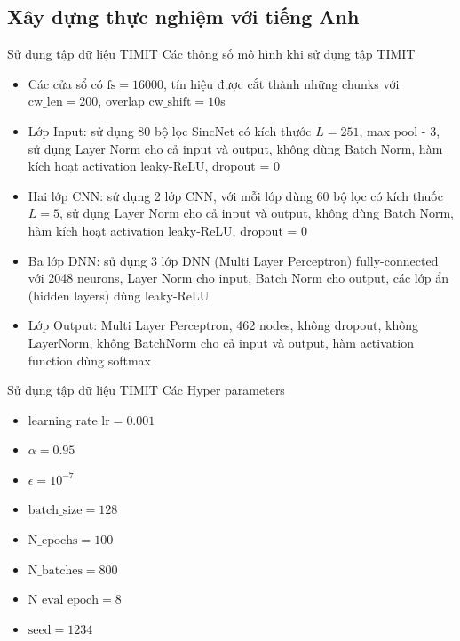 \documentclass[notheorems, aspectratio=54]{beamer}
\begin{document}
\subsection{Xây dựng thực nghiệm với \textbf{tiếng Anh}}
\begin{frame}{Sử dụng tập dữ liệu TIMIT}
	Các thông số mô hình khi sử dụng tập TIMIT
	\begin{itemize}
		\item Các cửa sổ có $\text{fs} = 16000$, tín hiệu được cắt thành những chunks với $\text{cw\_len}=200$, overlap $\text{cw\_shift}=10$s
		\item Lớp Input: sử dụng 80 bộ lọc SincNet có kích thước $L=251$, max pool - 3, sử dụng Layer Norm cho cả input và output, không dùng Batch Norm, hàm kích hoạt activation leaky-ReLU, dropout = 0
		\item Hai lớp CNN: sử dụng 2 lớp CNN, với mỗi lớp dùng 60 bộ lọc có kích thuốc $L=5$, sử dụng Layer Norm cho cả input và output, không dùng Batch Norm, hàm kích hoạt activation leaky-ReLU, dropout = 0
		\item Ba lớp DNN: sử dụng 3 lớp DNN (Multi Layer Perceptron) fully-connected với 2048 neurons, Layer Norm cho input, Batch Norm cho output, các lớp ẩn (hidden layers) dùng leaky-ReLU
		\item Lớp Output: Multi Layer Perceptron, 462 nodes, không dropout, không LayerNorm, không BatchNorm cho cả input và output, hàm activation function dùng softmax 
	\end{itemize}
\end{frame}
\begin{frame}{Sử dụng tập dữ liệu TIMIT}
	Các Hyper parameters
	\begin{itemize}
		\item learning rate $\text{lr} = 0.001$
		\item $\alpha = 0.95$
		\item $\epsilon = 10^{-7}$
		\item $\text{batch\_size}=128$
		\item $\text{N\_epochs}=100$
		\item $\text{N\_batches}=800$
		\item $\text{N\_eval\_epoch}=8$
		\item $\text{seed}=1234$
	\end{itemize}
\end{frame}
\end{document}
